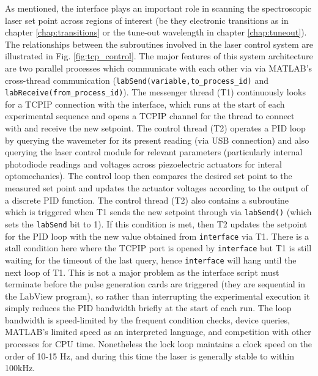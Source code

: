 	As mentioned, the interface plays an important role in scanning the spectroscopic laser set point across regions of interest (be they electronic transitions as in chapter \ref{chap:transitions} or the tune-out wavelength in chapter \ref{chap:tuneout}). 
	The relationships between the subroutines involved in the laser control system are illustrated in Fig. \ref{fig:tcp_control}.
	The major features of this system architecture are two parallel processes which communicate with each other via via MATLAB's cross-thread communication (\verb|labSend(variable,to_process_id)| and \verb|labReceive(from_process_id)|).
	The messenger thread (T1) continuously looks for a TCPIP connection with the interface, which runs at the start of each experimental sequence and opens a TCPIP channel for the thread to connect with and receive the new setpoint.
	The control thread (T2) operates a PID loop by querying the wavemeter for its present reading (via USB connection) and also querying the laser control module for relevant parameters (particularly internal photodiode readings and voltages across piezoelectric actuators for interal optomechanics).
	The control loop then compares the desired set point to the measured set point and updates the actuator voltages according to the output of a discrete PID function.
	The control thread (T2) also contains a subroutine which is triggered when T1 sends the new setpoint through via \verb|labSend()| (which sets the \verb|labSend| bit to 1).
	If this condition is met, then T2 updates the setpoint for the PID loop with the new value obtained from \verb|interface| via T1.
	There is a stall condition here where the TCPIP port is opened by \verb|interface| but T1 is still waiting for the timeout of the last query, hence \verb|interface| will hang until the next loop of T1.
	This is not a major problem as the interface script must terminate before the pulse generation cards are triggered (they are sequential in the LabView program), so rather than interrupting the experimental execution it simply reduces the PID bandwidth briefly at the start of each run.
	The loop bandwidth is speed-limited by the frequent condition checks, device queries, MATLAB's limited speed as an interpreted language, and competition with other processes for CPU time. 
	Nonetheless the lock loop maintains a clock speed on the order of 10-15 Hz, and during this time the laser is generally stable to within 100kHz.

